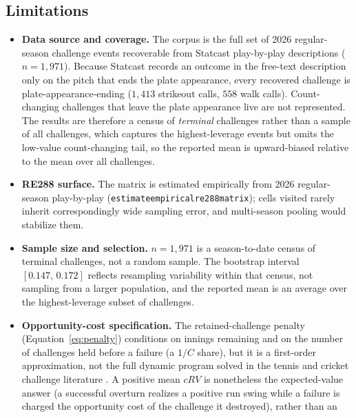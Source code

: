 \subsection{Limitations}
\label{sec:limitations}
\begin{itemize}
  \item \textbf{Data source and coverage.} The corpus is the full set of
        2026 regular-season challenge events recoverable from Statcast
        play-by-play descriptions ($n = 1{,}971$). Because Statcast records an
        outcome in the free-text description only on the pitch that ends the
        plate appearance, every recovered challenge is plate-appearance-ending
        ($1{,}413$ strikeout calls, $558$ walk calls). Count-changing
        challenges that leave the plate appearance live are not represented.
        The results are therefore a census of \emph{terminal} challenges rather
        than a sample of all challenges, which captures the highest-leverage
        events but omits the low-value count-changing tail, so the reported
        mean is upward-biased relative to the mean over all challenges.
  \item \textbf{RE288 surface.} The matrix is estimated empirically from 2026
        regular-season play-by-play
        (\texttt{estimate\crvus{}empirical\crvus{}re288\crvus{}matrix}); cells
        visited rarely inherit correspondingly wide sampling error, and
        multi-season pooling would stabilize them.
  \item \textbf{Sample size and selection.} $n = 1{,}971$ is a season-to-date
        census of terminal challenges, not a random sample. The bootstrap
        interval $[0.147,\,0.172]$ reflects resampling variability within that
        census, not sampling from a larger population, and the reported mean is
        an average over the highest-leverage subset of challenges.
  \item \textbf{Opportunity-cost specification.} The retained-challenge
        penalty (Equation~\ref{eq:penalty}) conditions on innings remaining and
        on the number of challenges held before a failure (a $1/C$ share), but
        it is a first-order approximation, not the full dynamic program solved
        in the tennis and cricket challenge literature
        \citep{abramitzky2012,clarkenorman2012,shivakumar2018}. A positive mean
        $cRV$ is nonetheless the expected-value answer (a successful overturn
        realizes a positive run swing while a failure is charged the
        opportunity cost of the challenge it destroyed), rather than an

\end{itemize}

